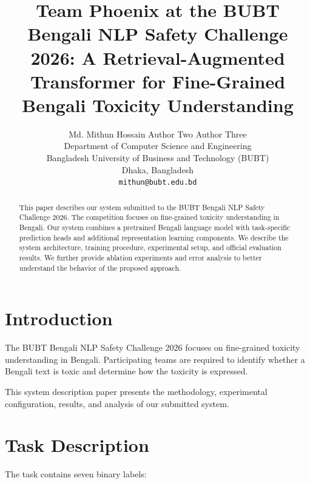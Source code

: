 \documentclass[10pt,a4paper]{article}
\title{
Team Phoenix at the BUBT Bengali NLP Safety Challenge 2026:
A Retrieval-Augmented Transformer for Fine-Grained Bengali Toxicity Understanding
}
\author{
Md. Mithun Hossain \quad
Author Two \quad
Author Three
\\
Department of Computer Science and Engineering
\\
Bangladesh University of Business and Technology (BUBT)
\\
Dhaka, Bangladesh
\\
\texttt{mithun@bubt.edu.bd}
}
\begin{document}
\maketitle

\thispagestyle{bubtfirstpage}



\begin{abstract}

This paper describes our system submitted to the BUBT
Bengali NLP Safety Challenge 2026. The competition focuses
on fine-grained toxicity understanding in Bengali. Our
system combines a pretrained Bengali language model with
task-specific prediction heads and additional representation
learning components. We describe the system architecture,
training procedure, experimental setup, and official
evaluation results. We further provide ablation experiments
and error analysis to better understand the behavior of the
proposed approach.

\end{abstract}



\section{Introduction}

The BUBT Bengali NLP Safety Challenge 2026 focuses on
fine-grained toxicity understanding in Bengali. Participating
teams are required to identify whether a Bengali text is toxic
and determine how the toxicity is expressed.

This system description paper presents the methodology,
experimental configuration, results, and analysis of our
submitted system.



\section{Task Description}

The task contains seven binary labels:
\end{document}
